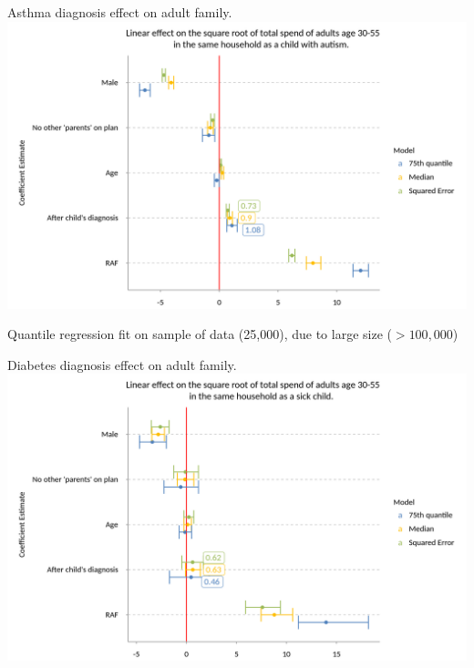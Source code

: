 \documentclass[xcolor=x11names,compress]{beamer}
\renewcommand{\(}{\begin{columns}}
\renewcommand{\)}{\end{columns}}
\newcommand{\<}[1]{\begin{column}{#1}}
\renewcommand{\>}{\end{column}}
\begin{document}
\begin{frame}{Asthma diagnosis effect on adult family. }
\includegraphics[width=\linewidth]{../figures/parameter_est_Asthma.png}

\center
\tiny
Quantile regression fit on sample of data (25,000), due to large size ($>100,000$)
\end{frame}

\begin{frame}{Diabetes diagnosis effect on adult family. }
\includegraphics[width=\linewidth]{../figures/parameter_est_T1D.png}
\end{frame}
\end{document}
